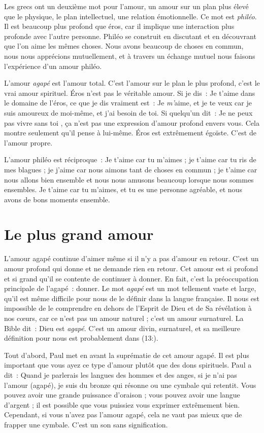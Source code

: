 Les grecs ont un deuxième mot pour l'amour,
 un amour sur un plan plus élevé que le physique, le plan intellectuel,
 une relation émotionnelle. Ce mot est \emph{philéo}.
 Il est beaucoup plus profond que éros, car il implique une interaction
 plus profonde avec l'autre personne.
 Philéo se construit en discutant et en découvrant que l'on aime
 les mêmes choses. Nous avons beaucoup de choses en commun,
 nous nous apprécions mutuellement, et à travers un échange mutuel
 nous faisons l'expérience d'un amour philéo.

L'amour \emph{agapé} est l'amour total.
 C'est l'amour sur le plan le plus profond, c'est le vrai amour spirituel.
 Éros n'est pas le véritable amour. Si je dis~: \og Je t'aime \fg{}
 dans le domaine de l'éros, ce que je dis vraiment est~:
 \og Je \emph{m'}aime, et je te veux car je suis amoureux de moi-même,
 et j'ai besoin de toi. \fg{}
 Si quelqu'un dit~: \og Je ne peux pas vivre sans toi \fg{},
 ça n'est pas une expression d'amour profond envers vous.
 Cela montre seulement qu'il pense à lui-même.
 Éros est extrêmement égoïste. C'est de l'amour propre.

L'amour philéo est réciproque~: \og Je t'aime car tu m'aimes ;
 je t'aime car tu ris de mes blagues ;
 je j'aime car nous aimons tant de choses en commun ;
 je t'aime car nous allons bien ensemble et nous nous amusons beaucoup
 lorsque nous sommes ensembles. Je t'aime car tu m'aimes,
 et tu es une personne agréable, et nous avons de bons moments ensemble. \fg{}


\section*{Le plus grand amour}

L'amour agapé continue d'aimer même si il n'y a pas d'amour en retour.
 C'est un amour profond qui donne et ne demande rien en retour.
 Cet amour est si profond et si grand qu'il se contente
 de continuer à donner.
 En fait, c'est la préoccupation principale de l'agapé~: donner.
 Le mot \emph{agapé} est un mot tellement vaste et large,
 qu'il est même difficile pour nous de le définir dans la langue française.
 Il nous est impossible de le comprendre en dehors de l'Esprit de Dieu
 et de Sa révélation à nos cœurs, car ce n'est pas un amour naturel ;
 c'est un amour surnaturel.
 La Bible dit~: \og Dieu est \emph{agapé}. \fg{}
 C'est un amour divin, surnaturel, et sa meilleure définition pour nous
 est probablement dans (13:).

Tout d'abord, Paul met en avant la suprématie de cet amour agapé.
 Il est plus important que vous ayez ce type d'amour
 plutôt que des dons spirituels. Paul a dit~:
 \og Quand je parlerais les langues des hommes et des anges,
 si je n'ai pas l'amour (agapé), je suis du bronze qui résonne
 ou une cymbale qui retentit. \fg{}
 Vous pouvez avoir une grande puissance d'oraison ;
 vous pouvez avoir une langue d'argent ;
 il est possible que vous puissiez vous exprimer extrêmement bien.
 Cependant, si vous n'avez pas l'amour agapé, cela ne vaut pas mieux
 que de frapper une cymbale. C'est un son sans signification.


